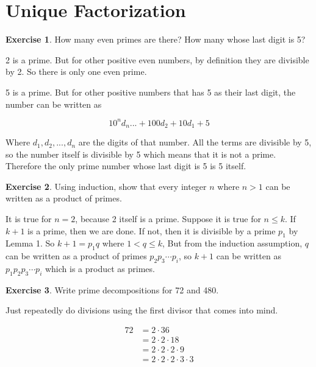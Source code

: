 \documentclass{article}
\theoremstyle{definition}
\newtheorem{exercise}{Exercise}[section]
\begin{document}
  \section{Unique Factorization}
  
  \begin{exercise}
    How many even primes are there? How many whose last digit is 5?
  \end{exercise}
  
  2 is a prime. But for other positive even numbers, by definition they are divisible by 2.
  So there is only one even prime.
  
  5 is a prime. But for other positive numbers that has 5 as their last digit, the number
  can be written as
  
  \begin{equation*}
  10^nd_n ... + 100d_2 + 10d_1 + 5
  \end{equation*}
  
  Where $d_1, d_2, ..., d_n$ are the digits of that number. All the terms are divisible by 5,
  so the number itself is divisible by 5 which means that it is not a prime. Therefore the
  only prime number whose last digit is 5 is 5 itself.
  
  \begin{exercise}
    Using induction, show that every integer $n$ where $n > 1$ can be written as a product of primes.
  \end{exercise}
  
  It is true for $n=2$, because 2 itself is a prime. Suppose it is true for $n \leq k$. If $k + 1$ is a prime, then we are
  done. If not, then it is divisible by a prime $p_1$ by Lemma 1. So $k + 1 = p_1 q$ where $1 < q \leq k$,
  But from the induction assumption, $q$ can be written as a product of primes $p_2p_3\cdots p_i$, so $k + 1$ can
  be written as $p_1p_2p_3\cdots p_i$ which is a product as primes.
  
  \begin{exercise}
    Write prime decompositions for 72 and 480.
  \end{exercise}
  
  Just repeatedly do divisions using the first divisor that comes into mind.
  
  \begin{align*}
    72 &= 2 \cdot 36 \\
         &= 2 \cdot 2 \cdot 18 \\
         &= 2 \cdot 2 \cdot 2 \cdot 9 \\
         &= 2 \cdot 2 \cdot 2 \cdot 3 \cdot 3
  \end{align*}
  
\end{document}
